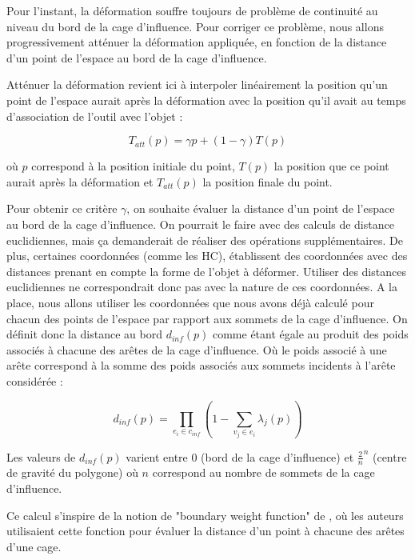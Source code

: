 Pour l'instant, la déformation souffre toujours de problème de continuité au
niveau du bord de la cage d'influence. Pour corriger ce problème, nous allons
progressivement atténuer la déformation appliquée, en fonction de la distance
d'un point de l'espace au bord de la cage d'influence.

Atténuer la déformation revient ici à interpoler linéairement la position
qu'un point de l'espace aurait après la déformation avec la position qu'il
avait au temps d'association de l'outil avec l'objet :

\begin{equation}
  T_{att}(p) = \gamma p + (1-\gamma) T(p)
\end{equation}

où $p$ correspond à la position initiale du point, $T(p)$ la position que ce
point aurait après la déformation et $T_{att}(p)$ la position finale du point.

Pour obtenir ce critère $\gamma$, on souhaite évaluer la distance d'un point
de l'espace au bord de la cage d'influence. On pourrait le faire avec des
calculs de distance euclidiennes, mais ça demanderait de réaliser des
opérations supplémentaires. De plus, certaines coordonnées (comme les HC),
établissent des coordonnées avec des distances prenant en compte la forme de
l'objet à déformer. Utiliser des distances euclidiennes ne correspondrait donc
pas avec la nature de ces coordonnées. A la place, nous allons utiliser les
coordonnées que nous avons déjà calculé pour chacun des points de l'espace par
rapport aux sommets de la cage d'influence. On définit donc la distance au
bord $d_{inf}(p)$ comme étant égale au produit des poids associés à chacune
des arêtes de la cage d'influence. Où le poids associé à une arête correspond
à la somme des poids associés aux sommets incidents à l'arête considérée :

\begin{equation}
  d_{inf}(p) = \prod_{e_i \in c_{inf}} (1 - \sum_{v_j \in e_i} \lambda_j(p))
\end{equation}

Les valeurs de $d_{inf}(p)$ varient entre 0 (bord de la cage d'influence) et
$\frac{2}{n}^n$ (centre de gravité du polygone) où $n$ correspond au nombre de
sommets de la cage d'influence.

Ce calcul s'inspire de la notion de "boundary weight function" de
\cite{GPCP13}, où les auteurs utilisaient cette fonction pour évaluer la
distance d'un point à chacune des arêtes d'une cage.

